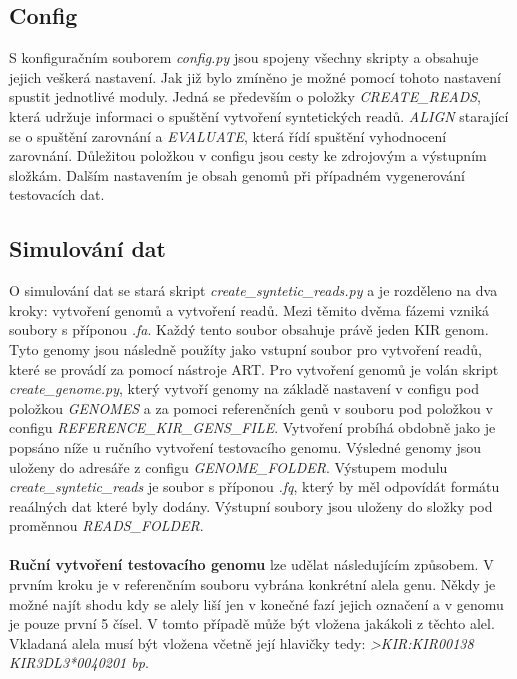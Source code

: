 \documentclass[czech,DP]{thesiskiv}
\numberwithin{equation}{section}
\begin{document}
\subsection{Config}
S konfiguračním souborem \textit{config.py} jsou spojeny všechny skripty a obsahuje jejich veškerá nastavení. Jak již bylo zmíněno je možné pomocí tohoto nastavení spustit jednotlivé moduly. Jedná se především o položky \textit{CREATE\_READS}, která udržuje informaci o spuštění vytvoření syntetických readů. \textit{ALIGN} starající se o spuštění zarovnání a \textit{EVALUATE}, která řídí spuštění vyhodnocení zarovnání. Důležitou položkou v configu jsou cesty ke zdrojovým a výstupním složkám. Dalším nastavením je obsah genomů při případném vygenerování testovacích dat.

\subsection{Simulování dat}
O simulování dat se stará skript \textit{create\_syntetic\_reads.py} a je rozděleno na dva kroky: vytvoření genomů a vytvoření readů. Mezi těmito dvěma fázemi vzniká soubory s příponou \textit{.fa}. Každý tento soubor obsahuje právě jeden KIR genom. Tyto genomy jsou následně použíty jako vstupní soubor pro vytvoření readů, které se provádí za pomocí nástroje ART. Pro vytvoření genomů je volán skript \textit{create\_genome.py}, který vytvoří genomy na základě nastavení v configu pod položkou \textit{GENOMES} a za pomoci referenčních genů v souboru pod položkou v configu \textit{REFERENCE\_KIR\_GENS\_FILE}. Vytvoření probíhá obdobně jako je popsáno níže u ručního vytvoření testovacího genomu. Výsledné genomy jsou uloženy do adresáře z configu \textit{GENOME\_FOLDER}. Výstupem modulu \textit{create\_syntetic\_reads} je soubor s příponou \textit{.fq}, který by měl odpovídát formátu reaálných dat které byly dodány. Výstupní soubory jsou uloženy do složky pod proměnnou \textit{READS\_FOLDER}.
\\
\\
\textbf{Ruční vytvoření testovacího genomu} lze udělat následujícím způsobem. V prvním kroku je v referenčním souboru vybrána konkrétní alela genu. Někdy je možné najít shodu kdy se alely liší jen v konečné fazí jejich označení a v genomu je pouze první 5 čísel. V tomto případě může být vložena jakákoli z těchto alel. Vkladaná alela musí být vložena včetně její hlavičky tedy: \textit{>KIR:KIR00138 \: KIR3DL3*0040201  \: bp}.
\end{document}
